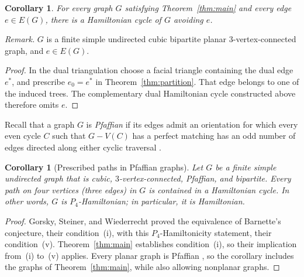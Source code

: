 \documentclass[11pt]{article}
\newtheorem{corollary}[theorem]{Corollary}
\theoremstyle{remark}
\numberwithin{equation}{section}
\begin{document}
\begin{corollary}\label{cor:edge-avoidance}
For every graph \(G\) satisfying Theorem~\ref{thm:main} and every
edge \(e\in E(G)\), there is a Hamiltonian cycle of \(G\) avoiding \(e\).
\end{corollary}

\noindent\textit{Remark.} $G$ is a finite simple undirected cubic bipartite planar $3$-vertex-connected graph, and $e\in E(G)$.


\begin{proof}
In the dual triangulation choose a facial triangle containing the dual
edge \(e^*\), and prescribe \(e_0=e^*\) in
Theorem~\ref{thm:partition}. That edge belongs to one of the induced
trees. The complementary dual Hamiltonian cycle constructed above
therefore omits \(e\).
\end{proof}

Recall that a graph \(G\) is \emph{Pfaffian} if its edges admit an
orientation for which every even cycle \(C\) such that \(G-V(C)\)
has a perfect matching has an odd number of edges directed along either
cyclic traversal \cite[Section~4]{GSW2023}.

\begin{corollary}[Prescribed paths in Pfaffian graphs]\label{cor:pfaffian-paths}
Let \(G\) be a finite simple undirected graph that is cubic,
\(3\)-vertex-connected, Pfaffian, and bipartite. Every path on four
vertices (three edges) in \(G\) is contained in a Hamiltonian cycle.
In other words, \(G\) is \(P_4\)-Hamiltonian; in particular, it is
Hamiltonian.
\end{corollary}

\begin{proof}
Gorsky, Steiner, and Wiederrecht \cite[Theorem~4.16]{GSW2023} proved
the equivalence of Barnette's conjecture, their condition~(i), with
this \(P_4\)-Hamiltonicity statement, their condition~(v).
Theorem~\ref{thm:main} establishes condition~(i), so their implication
from~(i) to~(v) applies. Every planar graph is Pfaffian
\cite[Theorem~4.6]{GSW2023}, so the corollary includes the graphs of
Theorem~\ref{thm:main}, while also allowing nonplanar graphs.
\end{proof}

{
\small
\setlength{\bibsep}{3pt}


}
\end{document}
